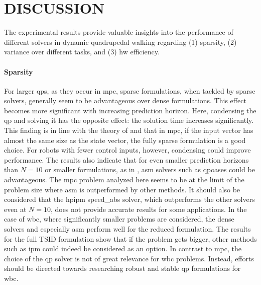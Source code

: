\section{DISCUSSION}%
\label{sec:discussion}
The experimental results provide valuable insights into the performance of different solvers in dynamic quadrupedal walking regarding (1) sparsity, (2) variance over different tasks, and (3) \gls{hw} efficiency.

\paragraph{Sparsity} For larger \gls{qp}s, as they occur in \gls{mpc}, sparse formulations, when tackled by sparse solvers, generally seem to be advantageous over dense formulations. 
This effect becomes more significant with increasing prediction horizon. 
Here, condensing the \gls{qp} and solving it has the opposite effect: the solution time increases significantly. 
This finding is in line with the theory of \cite{frison_efficient_2016} and \cite{axehill_controlling_2015} that in \gls{mpc}, if the input vector has almost the same size as the state vector, the fully sparse formulation is a good choice.
For robots with fewer control inputs, however, condensing could improve performance.
The results also indicate that for even smaller prediction horizons than $N=10$ or smaller formulations, as in \cite{di_carlo_dynamic_2018}, \gls{asm} solvers such as \acrshort{qpoases} could be advantageous. 
The \gls{mpc} problem analyzed here seems to be at the limit of the problem size where \gls{asm} is outperformed by other methods. 
It should also be considered that the \gls{hpipm} speed\_abs solver, which outperforms the other solvers even at $N=10$, does not provide accurate results for some applications. 
In the case of \gls{wbc}, where significantly smaller problems are considered, the dense solvers and especially \gls{asm} perform well for the reduced formulation. 
The results for the full TSID formulation show that if the problem gets bigger, other methods such as \gls{ipm} could indeed be considered as an option.
In contrast to \gls{mpc}, the choice of the \gls{qp} solver is not of great relevance for \gls{wbc} problems. Instead, efforts should be directed towards researching robust and stable \gls{qp} formulations for \gls{wbc}.

